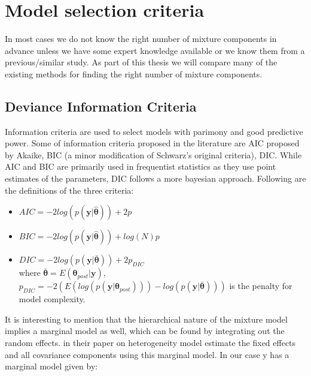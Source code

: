\chapter{Model selection criteria}
\label{ch : model_selection}

In most cases we do not know the right number of mixture components in advance unless we have some expert knowledge available or we know them from a previous/similar study. As part of this thesis we will compare many of the existing methods for finding the right number of mixture components.

\section{Deviance Information Criteria}
\label{sec : dic}
Information criteria are used to select models with parimony and good predictive power. Some of information criteria proposed in the literature are AIC proposed by Akaike, BIC (a minor modification of Schwarz's original criteria), DIC. While AIC and BIC are primarily used in frequentist statistics as they use point estimates of the parameters, DIC follows a more bayesian approach. Following are the definitions of the three criteria:\\

\begin{itemize}
\item $AIC = -2log(p(\boldsymbol{y}|\boldsymbol{\hat{\theta}})) + 2p$
\item $BIC = -2log(p(\boldsymbol{y}|\boldsymbol{\hat{\theta}})) + log(N)p$
\item $DIC = -2log(p(\boldsymbol{y}|\boldsymbol{\bar{\theta}})) + 2p_{DIC}$\\
where $\boldsymbol{\bar{\theta}} = E(\boldsymbol{\theta}_{post}|\boldsymbol{y})$,\\
$p_{DIC} = -2(E(log(p(\boldsymbol{y}|\boldsymbol{\theta}_{post}))) - log(p(\boldsymbol{y}|\boldsymbol{\bar{\theta}})))$ is the penalty for model complexity.
\end{itemize}

It is interesting to mention that the hierarchical nature of the mixture model implies a marginal model as well, which can be found by integrating out the random effects. \citet{verbeke_linear_1996} in their paper on heterogeneity model estimate the fixed effects and all covariance components using this marginal model. In our case y has a marginal model given by:\\

